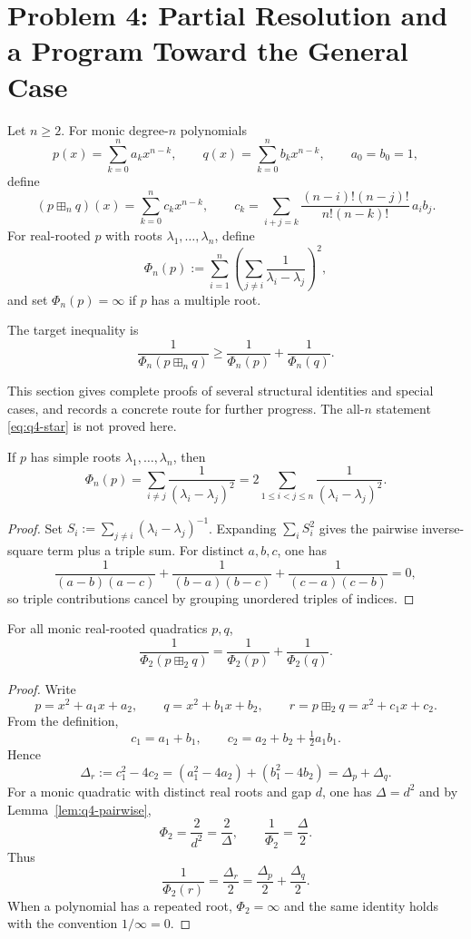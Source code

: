 \section{Problem 4: Partial Resolution and a Program Toward the General Case}\label{sec:q4}

Let $n\ge 2$. For monic degree-$n$ polynomials
\[
p(x)=\sum_{k=0}^n a_k x^{n-k},\qquad q(x)=\sum_{k=0}^n b_k x^{n-k},\qquad a_0=b_0=1,
\]
define
\[
(p\boxplus_n q)(x)=\sum_{k=0}^n c_k x^{n-k},
\qquad
c_k=\sum_{i+j=k}\frac{(n-i)!(n-j)!}{n!(n-k)!}\,a_i b_j.
\]
For real-rooted $p$ with roots $\lambda_1,\dots,\lambda_n$, define
\[
\Phi_n(p):=\sum_{i=1}^n\left(\sum_{j\ne i}\frac{1}{\lambda_i-\lambda_j}\right)^2,
\]
and set $\Phi_n(p)=\infty$ if $p$ has a multiple root.

The target inequality is
\[
\frac{1}{\Phi_n(p\boxplus_n q)}\ge \frac{1}{\Phi_n(p)}+\frac{1}{\Phi_n(q)}.
\tag{$\star$}\label{eq:q4-star}
\]

\begin{remark}
This section gives complete proofs of several structural identities and special cases, and records a concrete route for further progress. The all-$n$ statement \eqref{eq:q4-star} is not proved here.
\end{remark}

\begin{lemma}\label{lem:q4-pairwise}
If $p$ has simple roots $\lambda_1,\dots,\lambda_n$, then
\[
\Phi_n(p)=\sum_{i\ne j}\frac{1}{(\lambda_i-\lambda_j)^2}
=2\sum_{1\le i<j\le n}\frac{1}{(\lambda_i-\lambda_j)^2}.
\]
\end{lemma}

\begin{proof}
Set $S_i:=\sum_{j\ne i}(\lambda_i-\lambda_j)^{-1}$. Expanding $\sum_i S_i^2$ gives the pairwise inverse-square term plus a triple sum.
For distinct $a,b,c$, one has
\[
\frac{1}{(a-b)(a-c)}+\frac{1}{(b-a)(b-c)}+\frac{1}{(c-a)(c-b)}=0,
\]
so triple contributions cancel by grouping unordered triples of indices.
\end{proof}

\begin{proposition}[Exact equality for $n=2$]\label{prop:q4-n2}
For all monic real-rooted quadratics $p,q$,
\[
\frac{1}{\Phi_2(p\boxplus_2 q)}=\frac{1}{\Phi_2(p)}+\frac{1}{\Phi_2(q)}.
\]
\end{proposition}

\begin{proof}
Write
\[
p=x^2+a_1x+a_2,\qquad q=x^2+b_1x+b_2,\qquad r=p\boxplus_2 q=x^2+c_1x+c_2.
\]
From the definition,
\[
c_1=a_1+b_1,\qquad c_2=a_2+b_2+\tfrac12 a_1b_1.
\]
Hence
\[
\Delta_r:=c_1^2-4c_2=(a_1^2-4a_2)+(b_1^2-4b_2)=\Delta_p+\Delta_q.
\]
For a monic quadratic with distinct real roots and gap $d$, one has $\Delta=d^2$ and by Lemma~\ref{lem:q4-pairwise},
\[
\Phi_2=\frac{2}{d^2}=\frac{2}{\Delta},\qquad \frac{1}{\Phi_2}=\frac{\Delta}{2}.
\]
Thus
\[
\frac{1}{\Phi_2(r)}=\frac{\Delta_r}{2}=\frac{\Delta_p}{2}+\frac{\Delta_q}{2}.
\]
When a polynomial has a repeated root, $\Phi_2=\infty$ and the same identity holds with the convention $1/\infty=0$.
\end{proof}

